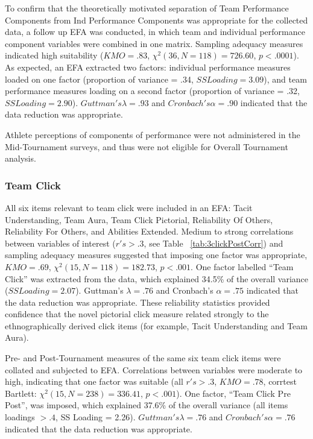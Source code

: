 \begin{CJK}{UTF8}{gbsn}
To confirm that the theoretically motivated separation of Team Performance Components from Ind Performance Components was appropriate for the collected data, a follow up EFA was conducted, in which team and individual performance component variables were combined in one matrix. Sampling adequacy measures indicated high suitability ($KMO = .83$, $\chi^2(36, N = 118) = 726.60$, $p < .0001$).  As expected, an EFA extracted two factors: individual performance measures loaded on one factor (proportion of variance = .34, $SS Loading = 3.09$), and team performance measures loading on a second factor (proportion of variance = .32, $SS Loading = 2.90$). $Guttman's \lambda =.93$ and $Cronbach's \alpha = .90$ indicated that the data reduction was appropriate.


Athlete perceptions of components of performance were not administered in the Mid-Tournament surveys, and thus were not eligible for Overall Tournament analysis.









\subsubsection{Team Click}

All six items relevant to team click were included in an EFA: Tacit Understanding, Team Aura, Team Click Pictorial, Reliability Of Others, Reliability For Others, and Abilities Extended.  Medium to strong correlations between variables of interest ($r's > .3$, see Table ~\ref{tab:3clickPostCorr}) and sampling adequacy measures suggested that imposing one factor was appropriate, $KMO =  .69$, $\chi^2(15, N = 118) = 182.73$, $p < .001$.  One factor labelled ``Team Click'' was extracted from the data, which explained 34.5\% of the overall variance ($SS Loading = 2.07$).  Guttman's $\lambda =.76$ and Cronbach's $\alpha = .75$ indicated that the data reduction was appropriate.  These reliability statistics provided confidence that the novel pictorial click measure related strongly to the ethnographically derived click items (for example, Tacit Understanding and Team Aura).


Pre- and Post-Tournament measures of the same six team click items were collated and subjected to EFA. Correlations between variables were moderate to high, indicating that one factor was suitable (all $r's > .3$, $KMO = .78$, corrtest Bartlett: $\chi^2(15, N = 238) = 336.41$, $p < .001$).  One factor, ``Team Click Pre Post'', was imposed, which explained 37.6\% of the overall variance (all items loadings $> .4$, SS Loading = 2.26).  $Guttman's \lambda =.76$ and $Cronbach's \alpha = .76$ indicated that the data reduction was appropriate.


\end{CJK}
